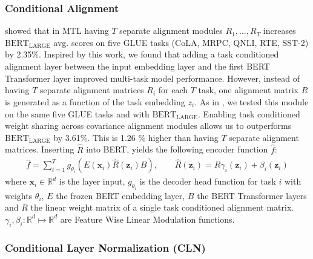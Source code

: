 \documentclass{article} \usepackage{iclr2021_conference,times}
\begin{document}
\subsubsection{Conditional Alignment}
\label{sec:alignment}
\citet{Wu2020Understanding} showed that in MTL having $T$ separate alignment modules $R_1,\dotsc,R_T$ increases $\text{BERT}_{\text{LARGE}}$ avg. scores on five GLUE tasks (CoLA, MRPC, QNLI, RTE, SST-2) by 2.35\%. Inspired by this work, we found that adding a task conditioned alignment layer between the input embedding layer and the first BERT Transformer layer improved multi-task model performance. However, instead of having $T$ separate alignment matrices $R_i$ for each $T$ task, one alignment matrix $\hat{R}$ is generated as a function of the task embedding $z_i$. As in \citet{Wu2020Understanding}, we tested this module on the same five GLUE tasks and with $\text{BERT}_{\text{LARGE}}$. Enabling task conditioned weight sharing across covariance alignment modules allows us to outperforms $\text{BERT}_{\text{LARGE}}$ by 3.61\%.  This is 1.26 \% higher than having $T$ separate alignment matrices. Inserting $\hat{R}$ into BERT, yields the following encoder function $\hat{f}$:
\begin{gather}
    \hat{f} = \sum\limits_{t=1}^T g_{\theta_i}(E(\textbf{x}_i)\hat{R}(\textbf{z}_i)B), \:\:\: \:\:\: \:\:\: \hat{R}(\textbf{z}_i) = R\gamma_{i}(\textbf{z}_i) + \beta_{i}(\textbf{z}_i) \label{eq:align}
\end{gather}
where $\textbf{x}_i \in \mathbb{R}^{d}$ is the layer input, $g_{\theta_i}$ is the decoder head function for task $i$ with weights $\theta_i$, $E$ the frozen BERT embedding layer, $B$ the BERT Transformer layers and $R$ the linear weight matrix of a single task conditioned alignment matrix. $\gamma_{i},\beta_{i}: \mathbb{R}^{d} \mapsto \mathbb{R}^{d}$ are Feature Wise Linear Modulation functions. 

\subsubsection{Conditional Layer Normalization (CLN)}
\label{sec:cond_layer_norm}
\end{document}
